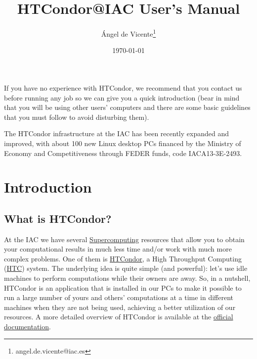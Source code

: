 \documentclass[a4paper,10pt]{article}
\author{Ángel de Vicente\thanks{angel.de.vicente@iac.es}}
\date{\today}
\title{HTCondor@IAC User's Manual}
\begin{document}
\maketitle
\setcounter{tocdepth}{4}
\tableofcontents

\small


\begin{mdframed}
\begin{warning}
If you have no experience with HTCondor, we recommend that you contact us before
running any job so we can give you a quick introduction (bear in mind that you
will be using other users' computers and there are some basic guidelines that
you must follow to avoid disturbing them).
\end{warning}
\end{mdframed}

\begin{mdframed}
\begin{note}
The HTCondor infrastructure at the IAC has been recently expanded and improved,
with about 100 new Linux desktop PCs financed by the Ministry of Economy and
Competitiveness through FEDER funds, code IACA13-3E-2493. 
\end{note}
\end{mdframed}

\section{Introduction}
\label{sec:orgba17326}

\subsection{What is HTCondor?}
\label{sec:orgfa26f54}

At the IAC we have several \href{http://research.iac.es/sieinvens/SINFIN/Main/supercomputing.php}{Supercomputing} resources that allow you to obtain
your computational results in much less time and/or work with much more complex
problems. One of them is \href{http://research.cs.wisc.edu/htcondor/}{HTCondor}, a High Throughput Computing (\href{http://en.wikipedia.org/wiki/High-throughput\_computing}{HTC}) system. The
underlying idea is quite simple (and powerful): let's use idle machines to
perform computations while their owners are away. So, in a nutshell, HTCondor is
an application that is installed in our PCs to make it possible to run a large
number of yours and others' computations at a time in different machines when
they are not being used, achieving a better utilization of our resources. A more
detailed overview of HTCondor is available at the \href{https://htcondor.readthedocs.io/en/v10\_0/overview/index.html}{official documentation}.
\end{document}
